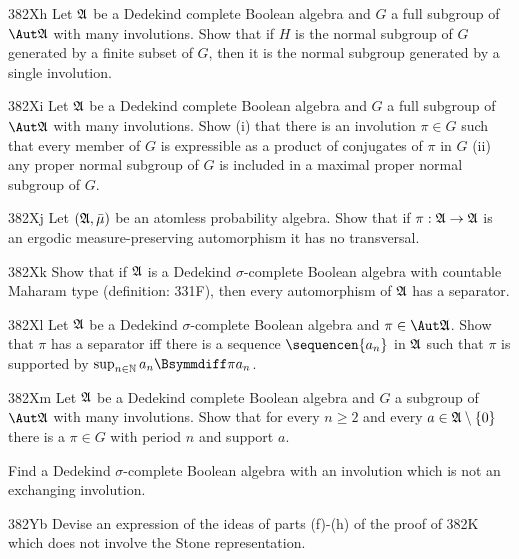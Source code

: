 {\spheader 382Xh %
Let $\frak A$ be a Dedekind complete Boolean algebra and
$G$ a full subgroup of $\Aut\frak A$ with many involutions.   Show that
if $H$ is the normal subgroup of $G$ generated by a finite subset of
$G$, then it is the normal subgroup generated by a single involution.

\spheader 382Xi %
Let $\frak A$ be a Dedekind complete Boolean algebra and
$G$ a full subgroup of $\Aut\frak A$ with many involutions.   Show (i)
that there is an involution $\pi\in G$ such that every member of $G$ is
expressible as a product of conjugates of $\pi$ in $G$ (ii) any proper
normal subgroup of $G$ is included in a maximal proper normal subgroup
of $G$.

\spheader 382Xj Let $(\frak A,\bar\mu)$ be an atomless probability algebra.
Show that if $\pi:\frak A\to\frak A$ is an ergodic
measure-preserving automorphism it has no transversal.  

\spheader 382Xk Show that if $\frak A$ is a Dedekind $\sigma$-complete
Boolean algebra with countable Maharam type (definition:  331F),
then every automorphism of $\frak A$ has a separator.   

\spheader 382Xl 
Let $\frak A$ be a Dedekind $\sigma$-complete Boolean
algebra and $\pi\in\Aut\frak A$.   Show that $\pi$ has a separator iff
there is a sequence $\sequencen{a_n}$ in $\frak A$ such that $\pi$ is
supported by $\sup_{n\in\Bbb N}a_n\Bsymmdiff\pi a_n$.

\spheader 382Xm
Let $\frak A$ be a Dedekind complete Boolean algebra and $G$ a subgroup of
$\Aut\frak A$ with many involutions.   Show that for every $n\ge 2$ and
every $a\in\frak A\setminus\{0\}$ there is a $\pi\in G$ with period $n$ and
support $a$.
    
Find a Dedekind $\sigma$-complete Boolean algebra with an involution
which is not an exchanging involution.

\spheader 382Yb 
Devise an expression of the ideas of parts (f)-(h) of the
proof of 382K which does not involve the Stone representation.

}
